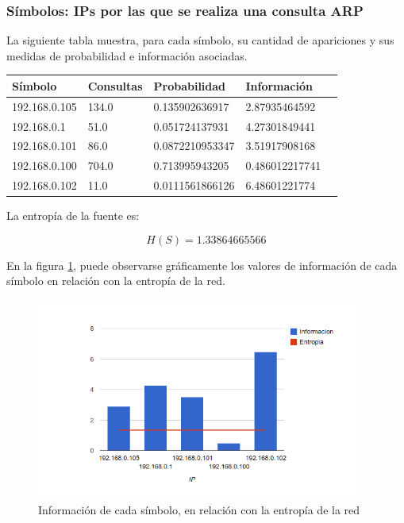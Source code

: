\documentclass{article}
\begin{document}
\subsubsection{Símbolos: IPs por las que se realiza una consulta ARP}
La siguiente tabla muestra, para cada símbolo, su cantidad de apariciones y
sus medidas de probabilidad e información asociadas.

\vskip10pt

\begin{tabular}{|l|l|l|l|l|}
  \hline
  Símbolo & Consultas & Probabilidad & Información \\
  \hline
  192.168.0.105 & 134.0 & 0.135902636917 & 2.87935464592\\
\hline
192.168.0.1 & 51.0 & 0.051724137931 & 4.27301849441\\
\hline
192.168.0.101 & 86.0 & 0.0872210953347 & 3.51917908168\\
\hline
192.168.0.100 & 704.0 & 0.713995943205 & 0.486012217741\\
\hline
192.168.0.102 & 11.0 & 0.0111561866126 & 6.48601221774\\
\hline
\end{tabular}

\vskip10pt

La entropía de la fuente es:

$$H(S) = 1.33864665566$$

En la figura \ref{fig:red2requested:infoentro}, puede observarse gráficamente
los valores de información de cada símbolo en relación con la entropía de la
red.

\begin{figure}[h!]
    \centering                                                       
    \includegraphics[width=300pt]{red2/consultadas2.png}
    \caption{Información de cada símbolo, en relación con la
        entropía de la red}
    \label{fig:red2requested:infoentro}
\end{figure}
\end{document}
